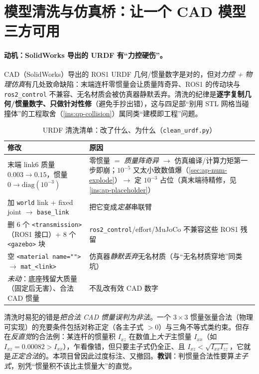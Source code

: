 \section{模型清洗与仿真桥：让一个 CAD 模型三方可用}
\label{sec:ap-model}

\paragraph{动机：SolidWorks 导出的 URDF 有“力控硬伤”。}
CAD（SolidWorks）导出的 ROS1 URDF 几何/惯量数字是对的，但对\emph{力控 + 物理仿真}有几处致命缺陷：末端连杆零惯量会让质量阵奇异、ROS1 的传动块与 \texttt{ros2\_control} 不兼容、无名材质会被仿真器静默丢弃。清洗的纪律是\textbf{逐字复制几何/惯量数字、只做针对性修}（避免手抄出错），这与四足部“别用 STL 网格当碰撞体”的工程取舍（\cref{ins:qp-collision}）属同类“建模即工程”问题。

\begin{table}[H]\centering\small
\caption{URDF 清洗清单：改了什么、为什么（\texttt{clean\_urdf.py}）}
\begin{tabular}{p{} p{}}
\toprule
修改 & 原因 \\
\midrule
末端 link6 质量 $0.003\!\to\!0.15$，惯量 $0\!\to\!\mathrm{diag}(10^{-3})$ & 零惯量 $=$ \emph{质量阵奇异} $\to$ 仿真编译/计算力矩第一步即崩；$10^{-5}$ 又太小致数值爆（\cref{sec:ap-num-explode}）$\to$ 定 $10^{-3}$ 占位（真末端待精修，见 \cref{ins:ap-placeholder}）\\
加 \texttt{world} link + fixed joint $\to$ \texttt{base\_link} & 把它变成\emph{定基}串联臂 \\
删 6 个 \texttt{<transmission>}（ROS1 接口）+ 8 个 \texttt{<gazebo>} 块 & \texttt{ros2\_control}/effort/MuJoCo 不兼容这些 ROS1 残留 \\
空 \texttt{<material name="">} $\to$ \texttt{mat\_<link>} & 仿真器\emph{静默丢弃}无名材质（与“无名材质穿地”同类坑）\\
\emph{未动}：底座残留大质量（固定后无害）、合法 CAD 惯量 & 不乱改有效 CAD 数字 \\
\bottomrule
\end{tabular}
\label{tab:ap-cleanurdf}
\end{table}

\begin{pitfall}\label{pit:ap-inertia-pd}
清洗时易犯的错是\emph{把合法 CAD 惯量误判为非法}。一个 $3\times3$ 惯量张量合法（物理可实现）的充要条件包括对称正定（各主子式 $>0$）与三角不等式类约束。但存在\emph{反直觉}的合法例：某连杆的惯量积 $I_{xz}$ 在数值上\emph{大于}主惯量 $I_{xx}$（如 $I_{xz}=0.00082>I_{xx}$），乍看像错，但只要主子式仍全正、且 $I_{xz}<\sqrt{I_{xx}I_{zz}}$，它就是\emph{正定合法}的。本项目曾因此过度标注、又撤回。\textbf{教训}：判惯量合法性要算\emph{主子式}，别凭“惯量积不该比主惯量大”的直觉。
\end{pitfall}

